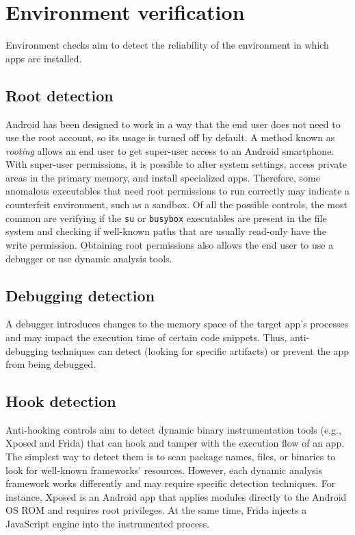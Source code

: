 
\section{Environment verification}
Environment checks aim to detect the reliability of the environment in which apps are installed.

\subsection{Root detection}
Android has been designed to work in a way that the end user does not need to use the root account, so its usage is turned off by default.
A method known as \textit{rooting} allows an end user to get super-user access to an Android smartphone. 
With super-user permissions, it is possible to alter system settings, access private areas in the primary memory, and install specialized apps.
Therefore, some anomalous executables that need root permissions to run correctly may indicate a counterfeit environment, such as a sandbox.
Of all the possible controls, the most common are verifying if the \texttt{su} or \texttt{busybox} executables are present in the file system and checking if well-known paths that are usually read-only have the write permission.
Obtaining root permissions also allows the end user to use a debugger or use dynamic analysis tools.

\subsection{Debugging detection} 
A debugger introduces changes to the memory space of the target app's processes and may impact the execution time of certain code snippets.
Thus, anti-debugging techniques can detect (looking for specific artifacts) or prevent the app from being debugged.

\subsection{Hook detection}
Anti-hooking controls aim to detect dynamic binary instrumentation tools (e.g., Xposed and Frida) that can hook and tamper with the execution flow of an app.
The simplest way to detect them is to scan package names, files, or binaries to look for well-known frameworks' resources.
However, each dynamic analysis framework works differently and may require specific detection techniques.
For instance, Xposed is an Android app that applies modules directly to the Android OS ROM and requires root privileges. At the same time, Frida injects a JavaScript engine into the instrumented process. 

